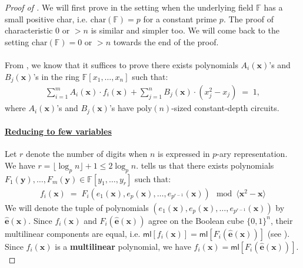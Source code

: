 \documentclass[11pt]{article}
\newcommand{\Boo}{\{0,1 \}}
\newcommand{\F}{\mathbb{F}}
\newcommand{\ml}{\mathsf{ml}}
\begin{document}
\begin{proof}[Proof of ]
We will first prove in the setting when the underlying field $\F$ has a small positive char, i.e. $\mathrm{char}(\F) = p$ for a constant prime $p$. The proof of characteristic $0$ or $> n$ is similar and simpler too. We will come back to the setting $\mathrm{char}(\F) = 0$ or $> n$ towards the end of the proof.

\paragraph{}From , we know that it suffices to prove there exists polynomials $A_{i}(\mathbf{x})$'s and $B_{j}(\mathbf{x})$'s in the ring $\F[x_{1},\ldots,x_{n}]$ such that:
\begin{align*}
    \sum_{i = 1}^{m} A_{i}(\mathbf{x}) \cdot f_{i}(\mathbf{x})  + \sum_{j=1}^{n} B_{j}(\mathbf{x}) \cdot (x_{j}^{2} - x_{j}) \; = \; 1,
\end{align*}
where $A_{i}(\mathbf{x})$'s and $B_{j}(\mathbf{x})$'s have $\mathrm{poly}(n)$-sized constant-depth circuits.

\paragraph{\underline{Reducing to few variables}}Let $r$ denote the number of digits when $n$ is expressed in $p$-ary representation. We have $r = \lfloor \log_{p} n \rfloor + 1 \leq 2 \log_{p} n$.  tells us that there exists polynomials $F_{1}(\mathbf{y}),\ldots,F_{m}(\mathbf{y}) \in \F[y_{1},\ldots,y_{r}]$ such that:
\begin{align*}
    f_{i}(\mathbf{x}) \; = \; F_{i}(e_{1}(\mathbf{x}), e_{p}(\mathbf{x}), \ldots, e_{p^{r-1}}(\mathbf{x})) \mod{\langle \mathbf{x}^{2} - \mathbf{x} \rangle}
\end{align*}
We will denote the tuple of polynomials $(e_{1}(\mathbf{x}), e_{p}(\mathbf{x}), \ldots, e_{p^{r-1}}(\mathbf{x}))$ by $\widehat{\mathbf{e}}(\mathbf{x})$.\newline
Since $f_{i}(\mathbf{x})$ and $F_{i}(\widehat{\mathbf{e}}(\mathbf{x}))$ agree on the Boolean cube $\Boo^{n}$, their multilinear components are equal, i.e. $\ml[f_{i}(\mathbf{x})] = \ml[F_{i}(\widehat{\mathbf{e}}(\mathbf{x}))]$ (see ). Since $f_{i}(\mathbf{x})$ is a \textbf{multilinear} polynomial, we have $f_{i}(\mathbf{x}) = \ml[F_{i}(\widehat{\mathbf{e}}(\mathbf{x}))]$.\\


\end{proof}
\end{document}

